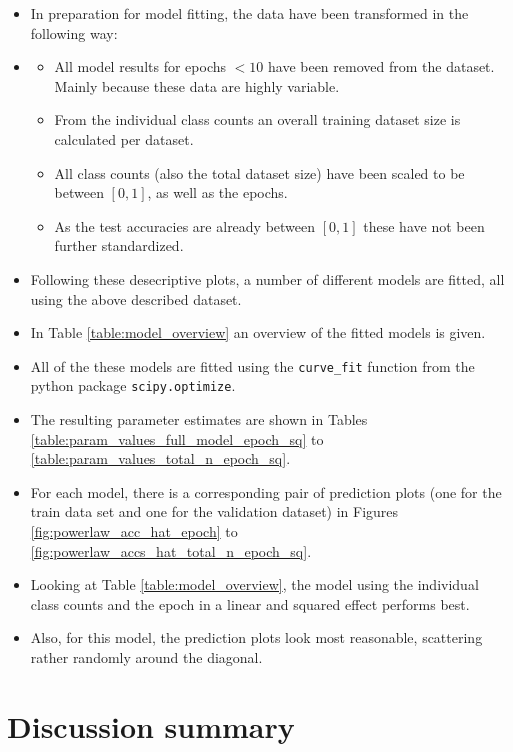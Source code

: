 \documentclass{article} %
\begin{document}
\begin{itemize}
    \item In preparation for model fitting, the data have been transformed in the following way:
    \item \begin{itemize}
        \item All model results for epochs $< 10$ have been removed from the dataset. Mainly because these data are highly variable.
        \item From the individual class counts an overall training dataset size is calculated per dataset.
        \item All class counts (also the total dataset size) have been scaled to be between $[0, 1]$, as well as the epochs.
        \item As the test accuracies are already between $[0,1]$ these have not been further standardized.
    \end{itemize}
    \item Following these desecriptive plots, a number of different models are fitted, all using the above described dataset.
    \item In Table \ref{table:model_overview} an overview of the fitted models is given.
    \item All of the these models are fitted using the \verb|curve_fit| function from the python package \verb|scipy.optimize|.
    \item The resulting parameter estimates are shown in Tables \ref{table:param_values_full_model_epoch_sq} to \ref{table:param_values_total_n_epoch_sq}.
    \item For each model, there is a corresponding pair of prediction plots (one for the train data set and one for the validation dataset) in Figures \ref{fig:powerlaw_acc_hat_epoch} to \ref{fig:powerlaw_accs_hat_total_n_epoch_sq}.
    \item Looking at Table \ref{table:model_overview}, the model using the individual class counts and the epoch in a linear and squared effect performs best. 
    \item Also, for this model, the prediction plots look most reasonable, scattering rather randomly around the diagonal.
\end{itemize}

\section{Discussion summary}
\end{document}
